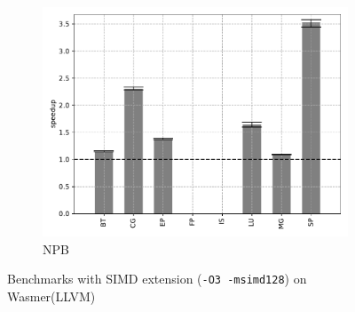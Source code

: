 \begin{figure}
\begin{subfigure}[t]{.45\textwidth}
        \includegraphics[width=\textwidth]
        {Images/6.1.RQ1/npb-wasmer-llvm-simd.pdf}
        \caption{NPB}
    \end{subfigure}
    \caption{Benchmarks with SIMD extension (\texttt{-O3 -msimd128}) on Wasmer(LLVM)}
    \label{fig:rq1-wasmer-llvm-simd}
\end{figure}

